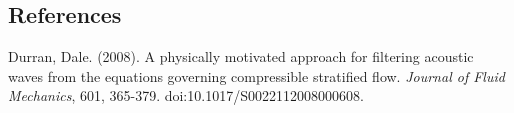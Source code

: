 \documentclass[a4paper,11pt]{article}
\begin{document}
% 
% 
% 
% 


% 
% 

\subsection*{References}
Durran, Dale. (2008). A physically motivated approach for filtering acoustic waves from the equations governing compressible stratified flow. \textit{Journal of Fluid Mechanics}, 601, 365-379. doi:10.1017/S0022112008000608.
\end{document}
